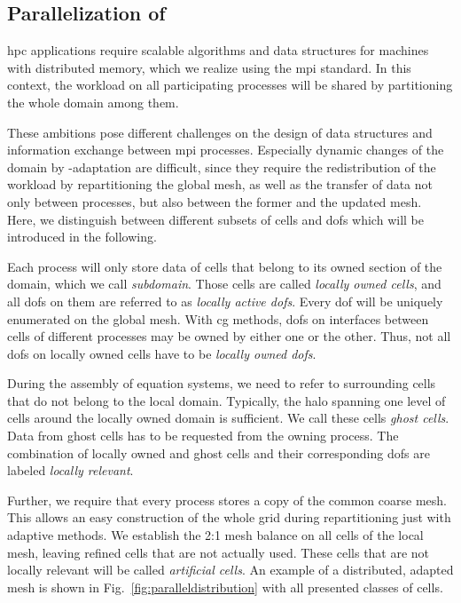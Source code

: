 \subsection{Parallelization of }

\Gls{hpc} applications require scalable algorithms and data structures for machines with distributed memory, which we realize using the \gls{mpi} \textcite{mpi31} standard. In this context, the workload on all participating processes will be shared by partitioning the whole domain among them.

These ambitions pose different challenges on the design of data structures and information exchange between \gls{mpi} processes. Especially dynamic changes of the domain by \hp-adaptation are difficult, since they require the redistribution of the workload by repartitioning the global mesh, as well as the transfer of data not only between processes, but also between the former and the updated mesh. Here, we distinguish between different subsets of cells and \glspl{dof} which will be introduced in the following.

Each process will only store data of cells that belong to its owned section of the domain, which we call \textit{subdomain}. Those cells are called \textit{locally owned cells}, and all \glspl{dof} on them are referred to as \textit{locally active \glspl{dof}}. Every \gls{dof} will be uniquely enumerated on the global mesh. With \gls{cg} methods, \glspl{dof} on interfaces between cells of different processes may be owned by either one or the other. Thus, not all \glspl{dof} on locally owned cells have to be \textit{locally owned \glspl{dof}}.

During the assembly of equation systems, we need to refer to surrounding cells that do not belong to the local domain. Typically, the halo spanning one level of cells around the locally owned domain is sufficient. We call these cells \textit{ghost cells}. Data from ghost cells has to be requested from the owning process. The combination of locally owned and ghost cells and their corresponding \glspl{dof} are labeled \textit{locally relevant}.

Further, we require that every process stores a copy of the common coarse mesh. This allows an easy construction of the whole grid during repartitioning just with adaptive methods. We establish the 2:1 mesh balance on all cells of the local mesh, leaving refined cells that are not actually used. These cells that are not locally relevant will be called \textit{artificial cells}. An example of a distributed, adapted mesh is shown in Fig.~\ref{fig:paralleldistribution} with all presented classes of cells.

